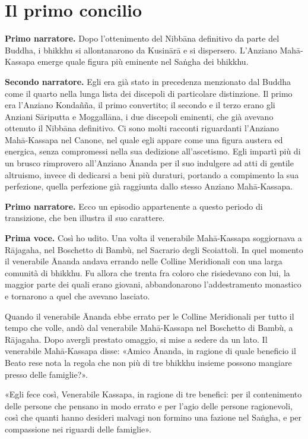 \chapter{Il primo concilio}

\textbf{Primo narratore.} Dopo l’ottenimento del Nibbāna definitivo da parte del
Buddha, i bhikkhu si allontanarono da Kusinārā e si dispersero.
L’Anziano Mahā-Kassapa emerge quale figura più eminente nel Saṅgha dei
bhikkhu.


\textbf{Secondo narratore.} Egli era già stato in precedenza menzionato dal
Buddha come il quarto nella lunga lista dei discepoli di particolare
distinzione. Il primo era l’Anziano Kondañña, il primo convertito; il
secondo e il terzo erano gli Anziani Sāriputta e Moggallāna, i due
discepoli eminenti, che già avevano ottenuto il Nibbāna definitivo. Ci
sono molti racconti riguardanti l’Anziano Mahā-Kassapa nel Canone, nel
quale egli appare come una figura austera ed energica, senza compromessi
nella sua dedizione all’ascetismo. Egli impartì più di un brusco
rimprovero all’Anziano Ānanda per il suo indulgere ad atti di gentile
altruismo, invece di dedicarsi a beni più duraturi, portando a
compimento la sua perfezione, quella perfezione già raggiunta dallo
stesso Anziano Mahā-Kassapa.


\textbf{Primo narratore.} Ecco un episodio appartenente a questo periodo di
transizione, che ben illustra il suo carattere.


\textbf{Prima voce.} Così ho udito. Una volta il venerabile Mahā-Kassapa
soggiornava a Rājagaha, nel Boschetto di Bambù, nel Sacrario degli
Scoiattoli. In quel momento il venerabile Ānanda andava errando nelle
Colline Meridionali con una larga comunità di bhikkhu. Fu allora che
trenta fra coloro che risiedevano con lui, la maggior parte dei quali
erano giovani, abbandonarono l’addestramento monastico e tornarono a
quel che avevano lasciato.


Quando il venerabile Ānanda ebbe errato per le Colline Meridionali per
tutto il tempo che volle, andò dal venerabile Mahā-Kassapa nel Boschetto
di Bambù, a Rājagaha. Dopo avergli prestato omaggio, si mise a sedere da
un lato. Il venerabile Mahā-Kassapa disse: «Amico Ānanda, in ragione di
quale beneficio il Beato rese nota la regola che non più di tre bhikkhu
insieme possono mangiare presso delle famiglie?».


«Egli fece così, Venerabile Kassapa, in ragione di tre benefici: per il
contenimento delle persone che pensano in modo errato e per l’agio delle
persone ragionevoli, così che quanti hanno desideri malvagi non formino
una fazione nel Saṅgha, e per compassione nei riguardi delle famiglie».


